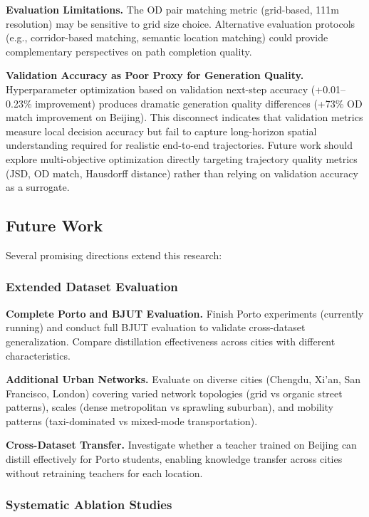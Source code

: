 \textbf{Evaluation Limitations.} The OD pair matching metric (grid-based, 111m resolution) may be sensitive to grid size choice. Alternative evaluation protocols (e.g., corridor-based matching, semantic location matching) could provide complementary perspectives on path completion quality.

\textbf{Validation Accuracy as Poor Proxy for Generation Quality.} Hyperparameter optimization based on validation next-step accuracy (+0.01--0.23\% improvement) produces dramatic generation quality differences (+73\% OD match improvement on Beijing). This disconnect indicates that validation metrics measure local decision accuracy but fail to capture long-horizon spatial understanding required for realistic end-to-end trajectories. Future work should explore multi-objective optimization directly targeting trajectory quality metrics (JSD, OD match, Hausdorff distance) rather than relying on validation accuracy as a surrogate.

\subsection{Future Work}
\label{sec:conclusion-future}

Several promising directions extend this research:

\subsubsection{Extended Dataset Evaluation}

\textbf{Complete Porto and BJUT Evaluation.} Finish Porto experiments (currently running) and conduct full BJUT evaluation to validate cross-dataset generalization. Compare distillation effectiveness across cities with different characteristics.

\textbf{Additional Urban Networks.} Evaluate on diverse cities (Chengdu, Xi'an, San Francisco, London) covering varied network topologies (grid vs organic street patterns), scales (dense metropolitan vs sprawling suburban), and mobility patterns (taxi-dominated vs mixed-mode transportation).

\textbf{Cross-Dataset Transfer.} Investigate whether a teacher trained on Beijing can distill effectively for Porto students, enabling knowledge transfer across cities without retraining teachers for each location.

\subsubsection{Systematic Ablation Studies}

